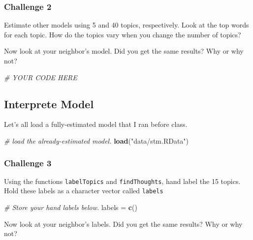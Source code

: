\documentclass[]{book}
\newenvironment{Shaded}{\begin{snugshade}}{\end{snugshade}}
\newcommand{\CommentTok}[1]{\textcolor[rgb]{0.56,0.35,0.01}{\textit{#1}}}
\newcommand{\KeywordTok}[1]{\textcolor[rgb]{0.13,0.29,0.53}{\textbf{#1}}}
\newcommand{\NormalTok}[1]{#1}
\newcommand{\StringTok}[1]{\textcolor[rgb]{0.31,0.60,0.02}{#1}}
\begin{document}
\hypertarget{challenge-2-4}{%
\subsubsection{Challenge 2}\label{challenge-2-4}}

Estimate other models using 5 and 40 topics, respectively. Look at the top words for each topic. How do the topics vary when you change the number of topics?

Now look at your neighbor's model. Did you get the same results? Why or why not?

\begin{Shaded}
\begin{Highlighting}[]
\CommentTok{# YOUR CODE HERE}
\end{Highlighting}
\end{Shaded}

\hypertarget{interprete-model}{%
\subsection{Interprete Model}\label{interprete-model}}

Let's all load a fully-estimated model that I ran before class.

\begin{Shaded}
\begin{Highlighting}[]
\CommentTok{# load the already-estimated model.}
\KeywordTok{load}\NormalTok{(}\StringTok{"data/stm.RData"}\NormalTok{)}
\end{Highlighting}
\end{Shaded}

\hypertarget{challenge-3-1}{%
\subsubsection*{Challenge 3}\label{challenge-3-1}}

Using the functions \texttt{labelTopics} and \texttt{findThoughts}, hand label the 15 topics. Hold these labels as a character vector called \texttt{labels}

\begin{Shaded}
\begin{Highlighting}[]
\CommentTok{# Store your hand labels below.}
\NormalTok{labels =}\StringTok{ }\KeywordTok{c}\NormalTok{()}
\end{Highlighting}
\end{Shaded}

Now look at your neighbor's labels. Did you get the same results? Why or why not?
\end{document}
